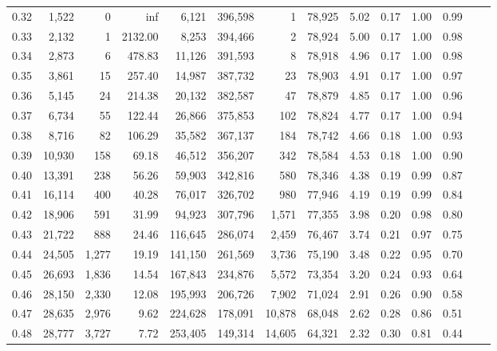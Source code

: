 \begin{tabular}{rrrrrrrrrrrrrr}
0.32 &   1,522 &      0 &      inf &    6,121 &  396,598 &       1 &  78,925 &  5.02 &  0.17 &  1.00 &      0.99 \\
0.33 &   2,132 &      1 &  2132.00 &    8,253 &  394,466 &       2 &  78,924 &  5.00 &  0.17 &  1.00 &      0.98 \\
0.34 &   2,873 &      6 &   478.83 &   11,126 &  391,593 &       8 &  78,918 &  4.96 &  0.17 &  1.00 &      0.98 \\
0.35 &   3,861 &     15 &   257.40 &   14,987 &  387,732 &      23 &  78,903 &  4.91 &  0.17 &  1.00 &      0.97 \\
0.36 &   5,145 &     24 &   214.38 &   20,132 &  382,587 &      47 &  78,879 &  4.85 &  0.17 &  1.00 &      0.96 \\
0.37 &   6,734 &     55 &   122.44 &   26,866 &  375,853 &     102 &  78,824 &  4.77 &  0.17 &  1.00 &      0.94 \\
0.38 &   8,716 &     82 &   106.29 &   35,582 &  367,137 &     184 &  78,742 &  4.66 &  0.18 &  1.00 &      0.93 \\
0.39 &  10,930 &    158 &    69.18 &   46,512 &  356,207 &     342 &  78,584 &  4.53 &  0.18 &  1.00 &      0.90 \\
0.40 &  13,391 &    238 &    56.26 &   59,903 &  342,816 &     580 &  78,346 &  4.38 &  0.19 &  0.99 &      0.87 \\
0.41 &  16,114 &    400 &    40.28 &   76,017 &  326,702 &     980 &  77,946 &  4.19 &  0.19 &  0.99 &      0.84 \\
0.42 &  18,906 &    591 &    31.99 &   94,923 &  307,796 &   1,571 &  77,355 &  3.98 &  0.20 &  0.98 &      0.80 \\
0.43 &  21,722 &    888 &    24.46 &  116,645 &  286,074 &   2,459 &  76,467 &  3.74 &  0.21 &  0.97 &      0.75 \\
0.44 &  24,505 &  1,277 &    19.19 &  141,150 &  261,569 &   3,736 &  75,190 &  3.48 &  0.22 &  0.95 &      0.70 \\
0.45 &  26,693 &  1,836 &    14.54 &  167,843 &  234,876 &   5,572 &  73,354 &  3.20 &  0.24 &  0.93 &      0.64 \\
0.46 &  28,150 &  2,330 &    12.08 &  195,993 &  206,726 &   7,902 &  71,024 &  2.91 &  0.26 &  0.90 &      0.58 \\
0.47 &  28,635 &  2,976 &     9.62 &  224,628 &  178,091 &  10,878 &  68,048 &  2.62 &  0.28 &  0.86 &      0.51 \\
0.48 &  28,777 &  3,727 &     7.72 &  253,405 &  149,314 &  14,605 &  64,321 &  2.32 &  0.30 &  0.81 &      0.44 \\

\end{tabular}
